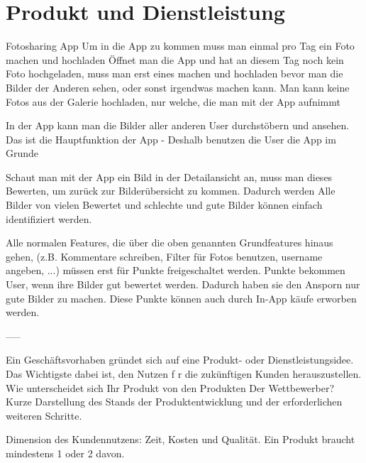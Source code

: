 \chapter{Produkt und Dienstleistung}

Fotosharing App
Um in die App zu kommen muss man einmal pro Tag ein Foto machen und hochladen
Öffnet man die App und hat an diesem Tag noch kein Foto hochgeladen, muss man erst eines machen und hochladen bevor man die Bilder der Anderen sehen, oder sonst irgendwas machen kann.
Man kann keine Fotos aus der Galerie hochladen, nur welche, die man mit der App aufnimmt

In der App kann man die Bilder aller anderen User durchstöbern und ansehen. Das ist die Hauptfunktion der App - Deshalb benutzen die User die App im Grunde

Schaut man mit der App ein Bild in der Detailansicht an, muss man dieses Bewerten, um zurück zur Bilderübersicht zu kommen. Dadurch werden Alle Bilder von vielen Bewertet und schlechte und gute Bilder können einfach identifiziert werden.

Alle normalen Features, die über die oben genannten Grundfeatures hinaus gehen, (z.B. Kommentare schreiben, Filter für Fotos benutzen, username angeben, ...) müssen erst für Punkte freigeschaltet werden.
Punkte bekommen User, wenn ihre Bilder gut bewertet werden. Dadurch haben sie den Ansporn nur gute Bilder zu machen.
Diese Punkte können auch durch In-App käufe erworben werden.


-----

Ein Geschäftsvorhaben gründet sich auf eine Produkt- oder Dienstleistungsidee.
Das Wichtigste dabei ist, den Nutzen f r die zukünftigen Kunden herauszustellen.
Wie unterscheidet sich Ihr Produkt von den Produkten
Der Wettbewerber?
Kurze Darstellung des Stands der Produktentwicklung und der erforderlichen weiteren Schritte.

Dimension des Kundennutzens: Zeit, Kosten und Qualität. Ein Produkt braucht mindestens 1 oder 2 davon.

